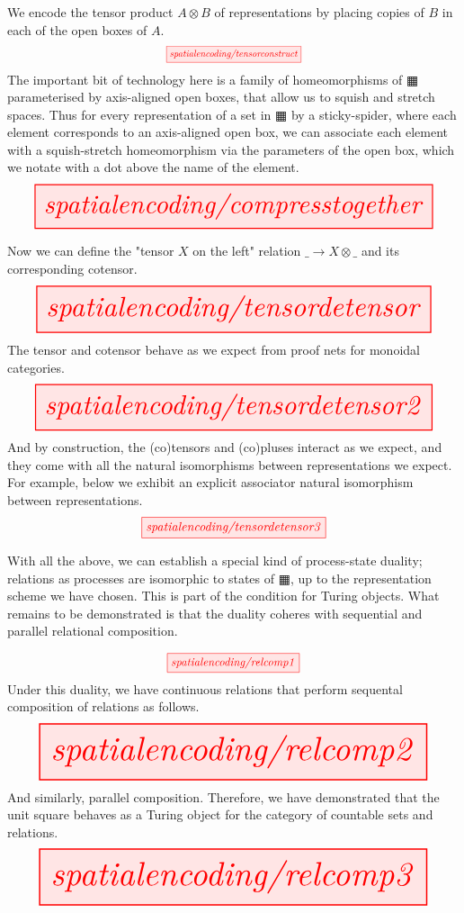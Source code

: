 We encode the tensor product $A \otimes B$ of representations by placing copies of $B$ in each of the open boxes of $A$.
\[\scalebox{0.75}{\tikzfig{spatialencoding/tensorconstruct}}\]
The important bit of technology here is a family of homeomorphisms of $\squarehvfill$ parameterised by axis-aligned open boxes, that allow us to squish and stretch spaces. Thus for every representation of a set in $\squarehvfill$ by a sticky-spider, where each element corresponds to an axis-aligned open box, we can associate each element with a squish-stretch homeomorphism via the parameters of the open box, which we notate with a dot above the name of the element.
\[\resizebox{\textwidth}{!}{\tikzfig{spatialencoding/compresstogether}}\]

Now we can define the "tensor $X$ on the left" relation $\_ \rightarrow X \otimes \_$ and its corresponding cotensor.
\[\resizebox{\textwidth}{!}{\tikzfig{spatialencoding/tensordetensor}}\]
The tensor and cotensor behave as we expect from proof nets for monoidal categories.
\[\resizebox{\textwidth}{!}{\tikzfig{spatialencoding/tensordetensor2}}\]
And by construction, the (co)tensors and (co)pluses interact as we expect, and they come with all the natural isomorphisms between representations we expect. For example, below we exhibit an explicit associator natural isomorphism between representations.
\[\scalebox{1}{\tikzfig{spatialencoding/tensordetensor3}}\]

\begin{construction}\label{cons:unitencoding}
With all the above, we can establish a special kind of process-state duality; relations as processes are isomorphic to states of $\squarehvfill$, up to the representation scheme we have chosen. This is part of the condition for Turing objects. What remains to be demonstrated is that the duality coheres with sequential and parallel relational composition.
\end{construction}
\[\scalebox{0.9}{\tikzfig{spatialencoding/relcomp1}}\]
Under this duality, we have continuous relations that perform sequental composition of relations as follows.
\[\resizebox{\textwidth}{!}{\tikzfig{spatialencoding/relcomp2}}\]
And similarly, parallel composition. Therefore, we have demonstrated that the unit square behaves as a Turing object for the category of countable sets and relations.
\[\resizebox{\textwidth}{!}{\tikzfig{spatialencoding/relcomp3}}\]